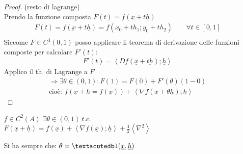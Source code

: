\documentclass[a4paper, oneside]{article}
\begin{document}
        \begin{proof}
            (resto di lagrange)\\
            Prendo la funzione composta $F(t) = f(\underline{x} + t \underline{h})$ 
            \begin{gather*}
                F(t) = f(\underbar{x} + t \underline{h}) = f(x_0+t h_1;y_0+t h_2) \qquad \forall t \in [0,1]\\
            \end{gather*}
            Siccome $F \in C^1(0,1)$ posso applicare il teorema di derivazione delle funzioni composte per calcolare $F'(t)$:
            \begin{gather*}
                F'(t) = \left\langle Df(\underline{x} + t\underbar{h}) ; \underline{h} \right\rangle
            \end{gather*}
            Applico il th. di Lagrange a $F$
            \begin{gather*}
                \Rightarrow \exists \theta \in (0,1): F(1) = F(0) + F'(\theta)(1-0)\\
                \text{cioè: }f(\underline{x} + \underline{h} = f(\underline{x})) + \left\langle \nabla f(\underline{x} + \theta \underline{h}); \underline{h} \right\rangle  
            \end{gather*}
        \end{proof}
        \begin{theorem}
             $f \in C^2(A)$  $\exists \theta \in (0,1) \ t.c.$\\
            $F(\underline{x}+ \underline{h}) = f(\underline{x}) + \left\langle \nabla f(\underline{x}); \underline{h}\right\rangle + \frac{1}{2} \left\langle \nabla^2 \right\rangle $
        \end{theorem}
       
        
    \begin{observation}
            Si ha sempre che: $\theta = \textacutedbl(\underline{x}, \underline{h})$\\
        \end{observation}
\end{document}
